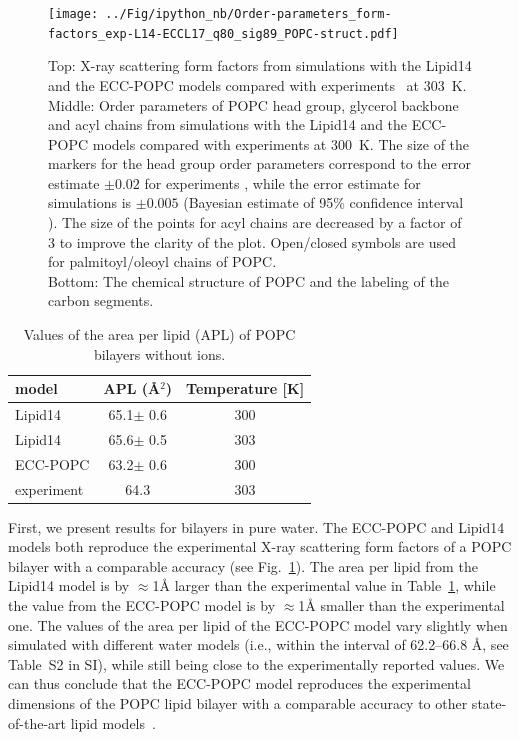 \documentclass[journal=jpcbfk,manuscript=article]{achemso}
\begin{document}
\begin{figure}[tb!]
  \centering
  \texttt{[image: ../Fig/ipython\_nb/Order-parameters\_form-factors\_exp-L14-ECCL17\_q80\_sig89\_POPC-struct.pdf]}
  \caption{\label{simVSexpNOions}
    Top: X-ray scattering form factors from simulations with the Lipid14 \cite{dickson14} and
    the ECC-POPC models compared with experiments~\cite{kucerka11} at 303~K. \\
    Middle: Order parameters of POPC head group, glycerol backbone and acyl chains 
    from simulations with the Lipid14 \cite{dickson14} and the ECC-POPC models
    compared with experiments \cite{ferreira13} at 300~K.
    The size of the markers for the head group order parameters correspond to
    the error estimate $\pm 0.02$ for experiments \cite{botan15,ollila16},
    while the error estimate for simulations is $\pm 0.005$
    (Bayesian estimate of 95\% confidence interval \cite{scipy}).
    The size of the points for acyl chains are decreased by a factor of 3 to improve the clarity of the plot.
    Open/closed symbols are used for palmitoyl/oleoyl chains of POPC. \\
    Bottom: The chemical structure of POPC and the labeling of the carbon segments.
  } 
\end{figure}

\begin{table}[tb!]
  \caption{Values of the area per lipid (APL) of POPC bilayers without ions. \label{tab:apls}
  }
  \begin{tabular}{l|c c}
    model          & APL (\AA$^2$)   & Temperature [K] \\
    \hline
    Lipid14                   & 65.1$\pm$ 0.6  &  300 \\
    Lipid14 \cite{dickson14}  & 65.6$\pm$ 0.5  &  303 \\
    \hline
    ECC-POPC                & 63.2$\pm$ 0.6  &  300       \\
    \hline
    experiment \cite{kucerka11} & 64.3  &  303    \\
    \hline
  \end{tabular}
\end{table}


First, we present results for bilayers in pure water.
The ECC-POPC and Lipid14 models both reproduce the experimental X-ray scattering form factors
of a POPC bilayer with a comparable accuracy (see Fig.~\ref{simVSexpNOions}).
The area per lipid from the Lipid14 model is by $\approx$1\AA{} larger than the
experimental value in Table~\ref{tab:apls}, while the value from the ECC-POPC model
is by $\approx$1\AA{} smaller than the experimental one.
The values of the area per lipid of the ECC-POPC model vary slightly
when simulated with different water models (i.e., within the interval of 62.2--66.8 \AA{}, see Table~S2 in SI),
while still being close to the experimentally reported values.
We can thus conclude that the ECC-POPC model reproduces the experimental dimensions of the POPC
lipid bilayer with a comparable accuracy to other state-of-the-art lipid models~\cite{ollila16}.
\end{document}

